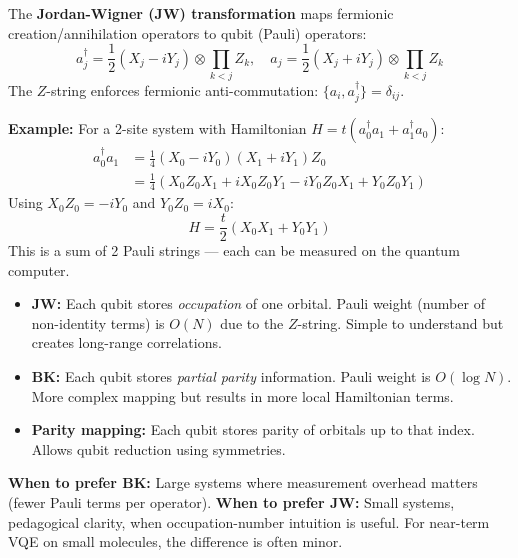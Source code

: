 \documentclass[11pt,a4paper]{article}
\begin{document}
\begin{answerbox}
The \textbf{Jordan-Wigner (JW) transformation} maps fermionic creation/annihilation operators to qubit (Pauli) operators:
\[
a_j^\dagger = \frac{1}{2}(X_j - iY_j) \otimes \prod_{k<j} Z_k, \quad a_j = \frac{1}{2}(X_j + iY_j) \otimes \prod_{k<j} Z_k
\]
The $Z$-string enforces fermionic anti-commutation: $\{a_i, a_j^\dagger\} = \delta_{ij}$.

\textbf{Example:} For a 2-site system with Hamiltonian $H = t(a_0^\dagger a_1 + a_1^\dagger a_0)$:
\begin{align}
a_0^\dagger a_1 &= \frac{1}{4}(X_0 - iY_0)(X_1 + iY_1) Z_0 \\
&= \frac{1}{4}(X_0 Z_0 X_1 + i X_0 Z_0 Y_1 - i Y_0 Z_0 X_1 + Y_0 Z_0 Y_1)
\end{align}
Using $X_0 Z_0 = -iY_0$ and $Y_0 Z_0 = iX_0$:
\[
H = \frac{t}{2}(X_0 X_1 + Y_0 Y_1)
\]
This is a sum of 2 Pauli strings --- each can be measured on the quantum computer.
\end{answerbox}

\begin{answerbox}
\begin{itemize}
    \item \textbf{JW:} Each qubit stores \emph{occupation} of one orbital. Pauli weight (number of non-identity terms) is $O(N)$ due to the $Z$-string. Simple to understand but creates long-range correlations.
    \item \textbf{BK:} Each qubit stores \emph{partial parity} information. Pauli weight is $O(\log N)$. More complex mapping but results in more local Hamiltonian terms.
    \item \textbf{Parity mapping:} Each qubit stores parity of orbitals up to that index. Allows qubit reduction using symmetries.
\end{itemize}
\textbf{When to prefer BK:} Large systems where measurement overhead matters (fewer Pauli terms per operator). \textbf{When to prefer JW:} Small systems, pedagogical clarity, when occupation-number intuition is useful. For near-term VQE on small molecules, the difference is often minor.
\end{answerbox}
\end{document}
